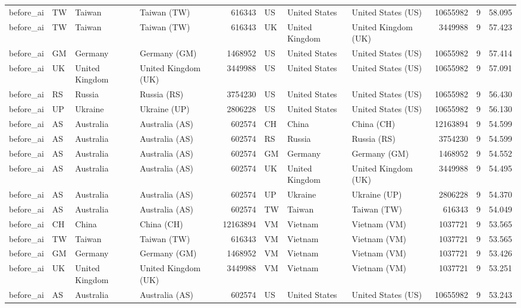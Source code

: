 \begin{tabular}{llllrlllrrr}
before\_ai & TW & Taiwan & Taiwan (TW) & 616343 & US & United States & United States (US) & 10655982 & 9 & 58.095 \\
before\_ai & TW & Taiwan & Taiwan (TW) & 616343 & UK & United Kingdom & United Kingdom (UK) & 3449988 & 9 & 57.423 \\
before\_ai & GM & Germany & Germany (GM) & 1468952 & US & United States & United States (US) & 10655982 & 9 & 57.414 \\
before\_ai & UK & United Kingdom & United Kingdom (UK) & 3449988 & US & United States & United States (US) & 10655982 & 9 & 57.091 \\
before\_ai & RS & Russia & Russia (RS) & 3754230 & US & United States & United States (US) & 10655982 & 9 & 56.430 \\
before\_ai & UP & Ukraine & Ukraine (UP) & 2806228 & US & United States & United States (US) & 10655982 & 9 & 56.130 \\
before\_ai & AS & Australia & Australia (AS) & 602574 & CH & China & China (CH) & 12163894 & 9 & 54.599 \\
before\_ai & AS & Australia & Australia (AS) & 602574 & RS & Russia & Russia (RS) & 3754230 & 9 & 54.599 \\
before\_ai & AS & Australia & Australia (AS) & 602574 & GM & Germany & Germany (GM) & 1468952 & 9 & 54.552 \\
before\_ai & AS & Australia & Australia (AS) & 602574 & UK & United Kingdom & United Kingdom (UK) & 3449988 & 9 & 54.495 \\
before\_ai & AS & Australia & Australia (AS) & 602574 & UP & Ukraine & Ukraine (UP) & 2806228 & 9 & 54.370 \\
before\_ai & AS & Australia & Australia (AS) & 602574 & TW & Taiwan & Taiwan (TW) & 616343 & 9 & 54.049 \\
before\_ai & CH & China & China (CH) & 12163894 & VM & Vietnam & Vietnam (VM) & 1037721 & 9 & 53.565 \\
before\_ai & TW & Taiwan & Taiwan (TW) & 616343 & VM & Vietnam & Vietnam (VM) & 1037721 & 9 & 53.565 \\
before\_ai & GM & Germany & Germany (GM) & 1468952 & VM & Vietnam & Vietnam (VM) & 1037721 & 9 & 53.426 \\
before\_ai & UK & United Kingdom & United Kingdom (UK) & 3449988 & VM & Vietnam & Vietnam (VM) & 1037721 & 9 & 53.251 \\
before\_ai & AS & Australia & Australia (AS) & 602574 & US & United States & United States (US) & 10655982 & 9 & 53.243 \\

\end{tabular}
